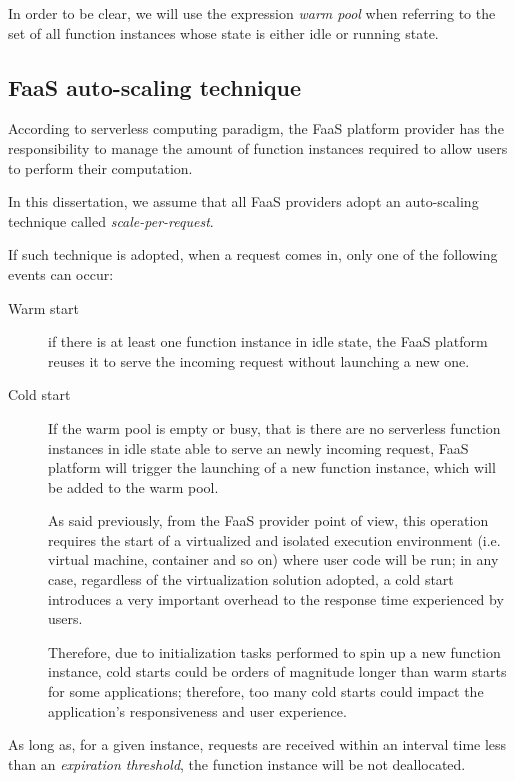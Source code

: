 \documentclass[12pt,a4paper]{report}
\begin{document}
In order to be clear, we will use the expression \textit{warm pool} when referring to the set of all function instances whose state is either idle or running state.

\subsection{FaaS auto-scaling technique}

According to serverless computing paradigm, the FaaS platform provider has the responsibility to manage the amount of function instances required to allow users to perform their computation.

In this dissertation, we assume that all FaaS providers adopt an auto-scaling technique called \textit{scale-per-request}.

If such technique is adopted, when a request comes in, only one of the following events can occur:

\begin{description}
	
	\item[Warm start] if there is at least one function instance in idle state, the FaaS platform reuses it to serve the incoming request without launching a new one.
	
	\item[Cold start] If the warm pool is empty or busy, that is there are no serverless function instances in idle state able to serve an newly incoming request, FaaS platform will trigger the launching of a new function instance, which will be added to the warm pool.
	
	As said previously, from the FaaS provider point of view, this operation requires the start of a virtualized and isolated execution environment (i.e. virtual machine, container and so on) where user code will be run; in any case, regardless of the virtualization solution adopted, a cold start introduces a very important overhead to the response time experienced by users. 
	
	Therefore, due to initialization tasks performed to spin up a new function instance, cold starts could be orders of magnitude longer than warm starts for some applications; therefore, too many cold starts could impact the application’s responsiveness and user experience.
\end{description} 

As long as, for a given instance, requests are received within an interval time less than an \textit{expiration threshold}, the function instance will be not deallocated.
\end{document}
